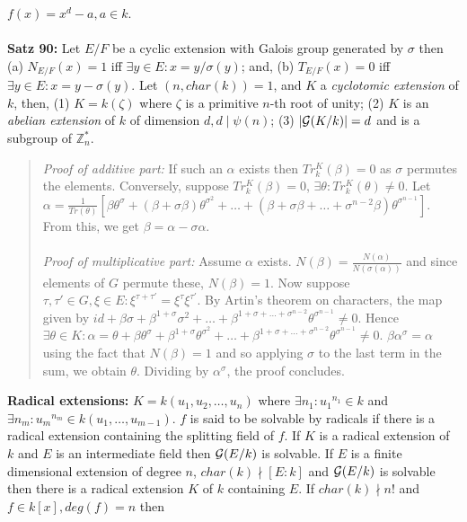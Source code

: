$f(x)= x^d-a, a \in k$.
\\
\\
{\bf Satz 90:}  Let $E/F$ be a cyclic extension with Galois group generated by
$\sigma$ then 
(a) $N_{E/F}(x)= 1$ iff $\exists y \in E: x= y/\sigma(y)$; and,
(b) $T_{E/F}(x)= 0$ iff $\exists y \in E: x= y - \sigma(y)$.
Let $(n, char(k))= 1$, and $K$ a \emph{cyclotomic extension} of $k$, then,
(1) $K= k(\zeta)$ where $\zeta$ is a primitive $n$-th root of unity;
(2) $K$ is an \emph{abelian extension} of $k$ of dimension $d, d \mid \psi(n)$;
(3) $|{\cal G}(K/k)|=d$ and is a subgroup of ${\mathbb Z}_n^*$.
\begin{quote}
\emph{Proof of additive part:}
If such an $\alpha$ exists then $Tr_k^K(\beta)=0$ as $\sigma$ permutes
the elements. Conversely,
suppose $Tr_k^K(\beta)=0$, $\exists \theta: Tr_k^K(\theta) \ne 0$.
Let $\alpha = {\frac 1 {Tr(\theta)}} [ 
\beta \theta^{\sigma} +
(\beta + \sigma \beta) \theta^{\sigma^2} + \ldots +
(\beta + \sigma \beta + \ldots + \sigma^{n-2} \beta) \theta^{\sigma^{n-1}}]$.
From this, we get $\beta= \alpha - \sigma \alpha$.
\\
\\
\emph{Proof of multiplicative part:}
Assume $\alpha$ exists.  $N(\beta)= {\frac {N(\alpha)} {N(\sigma(\alpha))}}$ 
and since elements of $G$ permute these, $N(\beta)=1$.  Now suppose
$\tau, \tau' \in G, \xi \in E: \xi^{\tau + \tau'}= 
\xi^{\tau} \xi^{\tau'} $.   By Artin's theorem on characters, the map given by
$ id+ \beta \sigma + \beta^{1+\sigma} \sigma^2+ \ldots +
\beta^{1+\sigma + \ldots + \sigma^{n-2}} \theta^{\sigma^{n-1}} \ne 0 $.
Hence $\exists \theta \in K: 
\alpha= \theta + \beta \theta^{\sigma} + \beta^{1+\sigma} \theta^{\sigma^2} + \ldots +
\beta^{1 + \sigma + \ldots + \sigma^{n-2}} \theta^{\sigma^{n-1}} \ne 0$.  
$\beta \alpha^{\sigma}= \alpha$ using the fact that $N(\beta)=1$ and so
applying $\sigma$ to the last term in the sum, we obtain $\theta$.  Dividing by
$\alpha^{\sigma}$, the proof concludes.
\end{quote}
{\bf Radical extensions:} $K= k(u_1, u_2, \ldots , u_n)$ where
$\exists n_1 : {u_1}^{n_1} \in k$ and
$\exists n_m : {u_m}^{n_m} \in k(u_1 , \ldots , u_{m-1})$.  $f$ is said to
be solvable by radicals if there is a radical extension containing the splitting
field of $f$.
If $K$ is a radical extension of $k$  and $E$ is an intermediate field
then ${\cal G}(E/k)$ is solvable.
If $E$ is a finite dimensional extension of degree $n$, $char(k) \nmid [E:k]$
and ${\cal G}(E/k)$ is solvable then there is a radical extension
$K$ of $k$ containing $E$.  If $char(k) \nmid n!$ and $f \in k[x], deg(f)=n$ then
